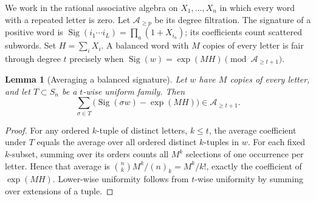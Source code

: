 \documentclass[11pt]{article}
\newtheorem{lemma}{Lemma}
\newcommand{\Sig}{\operatorname{Sig}}
\begin{document}
We work in the rational associative algebra on $X_1,\ldots,X_n$ in
which every word with a repeated letter is zero. Let $\mathcal A_{\ge p}$
be its degree filtration. The signature of a positive word is
$\Sig(i_1\cdots i_L)=\prod_a(1+X_{i_a})$; its coefficients count
scattered subwords. Set $H=\sum_iX_i$.
A balanced word with $M$ copies of every letter is fair through degree
$t$ precisely when
$\Sig(w)=\exp(MH)\pmod{\mathcal A_{\ge t+1}}$.

\begin{lemma}[Averaging a balanced signature]\label{average}
Let $w$ have $M$ copies of every letter, and let $T\subset S_n$ be a
$t$-wise uniform family. Then
\[
 \sum_{\sigma\in T}\bigl(\Sig(\sigma w)-\exp(MH)\bigr)
 \in\mathcal A_{\ge t+1}.
\]
\end{lemma}
\begin{proof}
For any ordered $k$-tuple of distinct letters, $k\le t$, the average
coefficient under $T$ equals the average over all ordered distinct
$k$-tuples in $w$. For each fixed $k$-subset, summing over its orders
counts all $M^k$ selections of one occurrence per letter.
Hence that average is
$\binom nkM^k/(n)_k=M^k/k!$, exactly the coefficient of $\exp(MH)$.
Lower-wise uniformity follows from $t$-wise uniformity by summing over
extensions of a tuple.
\end{proof}
\end{document}
